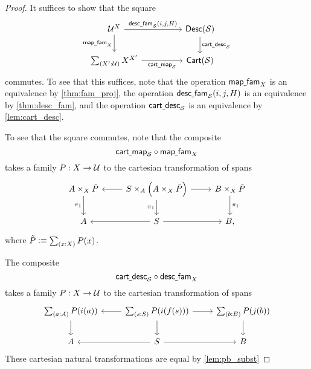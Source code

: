 \begin{proof}
It suffices to show that the square
\begin{equation*}
\begin{tikzcd}[column sep=huge]
\UU^X \arrow[r,"{\mathsf{desc\usc{}fam}_{\mathcal{S}}(i,j,H)}"] \arrow[d,swap,"\mathsf{map\usc{}fam}_X"] & \mathsf{Desc}(\mathcal{S}) \arrow[d,"\mathsf{cart\usc{}desc}_{\mathcal{S}}"] \\
\sm{X':\UU}X^{X'} \arrow[r,swap,"\mathsf{cart\usc{}map}_{\mathcal{S}}"] & \mathsf{Cart}(\mathcal{S})
\end{tikzcd}
\end{equation*}
commutes. To see that this suffices, note that the operation $\mathsf{map\underline{\ }{}fam}_X$ is an equivalence by \cref{thm:fam_proj}, the operation $\mathsf{desc\underline{\ }{}fam}_{\mathcal{S}}(i,j,H)$ is an equivalence by \cref{thm:desc_fam}, and the operation $\mathsf{cart\underline{\ }{}desc}_{\mathcal{S}}$ is an equivalence by \cref{lem:cart_desc}.

To see that the square commutes, note that the composite
\begin{equation*}
\mathsf{cart\underline{\ }{}map}_{\mathcal{S}}\circ \mathsf{map\underline{\ }{}fam}_X
\end{equation*}
takes a family $P:X\to \mathcal{U}$ to the cartesian transformation of spans
\begin{equation*}
\begin{tikzcd}
A\times_X\tilde{P} \arrow[d,swap,"\pi_1"] & S\times_A\Big(A\times_X\tilde{P}\Big) \arrow[l] \arrow[r] \arrow[d,swap,"\pi_1"] & B\times_X\tilde{P} \arrow[d,"\pi_1"] \\
A & S \arrow[l] \arrow[r] & B,
\end{tikzcd}
\end{equation*}
where $\tilde{P}\defeq\sm{x:X}P(x)$.

The composite 
\begin{equation*}
\mathsf{cart\underline{\ }{}desc}_{\mathcal{S}}\circ \mathsf{desc\underline{\ }{}fam}_X
\end{equation*}
takes a family $P:X\to \mathcal{U}$ to the cartesian transformation of spans
\begin{equation*}
\begin{tikzcd}
\sm{a:A}P(i(a)) \arrow[d] & \sm{s:S}P(i(f(s))) \arrow[l] \arrow[r] \arrow[d] & \sm{b:B}P(j(b)) \arrow[d] \\
A & S \arrow[l] \arrow[r] & B
\end{tikzcd}
\end{equation*}
These cartesian natural transformations are equal by \cref{lem:pb_subst}
\end{proof}

